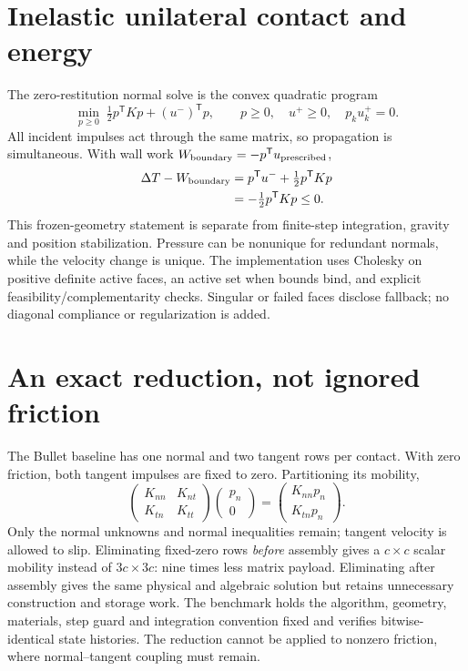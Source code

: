 \documentclass[11pt]{article}
\begin{document}
\section{Inelastic unilateral contact and energy}
The zero-restitution normal solve is the convex quadratic program
\begin{equation}
 \min_{p\geq0}\;\tfrac12p^{\mathsf T}Kp+(u^-)^{\mathsf T}p,
 \qquad p\geq0,\quad u^+\geq0,\quad p_k u_k^+=0.
\end{equation}
All incident impulses act through the same matrix, so propagation is simultaneous.
With wall work $W_{\rm boundary}=-p^{\mathsf T}u_{\rm prescribed}$,
\begin{align}
 \Delta T-W_{\rm boundary}
 &=p^{\mathsf T}u^-+\tfrac12p^{\mathsf T}Kp\\
 &=-\tfrac12p^{\mathsf T}Kp\leq0.
\end{align}
This frozen-geometry statement is separate from finite-step integration,
gravity and position stabilization. Pressure can be nonunique for redundant
normals, while the velocity change is unique. The implementation uses Cholesky
on positive definite active faces, an active set when bounds bind, and explicit
feasibility/complementarity checks. Singular or failed faces disclose fallback;
no diagonal compliance or regularization is added.

\section{An exact reduction, not ignored friction}
The Bullet baseline has one normal and two tangent rows per contact. With zero
friction, both tangent impulses are fixed to zero. Partitioning its mobility,
\begin{equation}
 \begin{pmatrix}K_{nn}&K_{nt}\\K_{tn}&K_{tt}\end{pmatrix}
 \begin{pmatrix}p_n\\0\end{pmatrix}
 =\begin{pmatrix}K_{nn}p_n\\K_{tn}p_n\end{pmatrix}.
\end{equation}
Only the normal unknowns and normal inequalities remain; tangent velocity is
allowed to slip. Eliminating fixed-zero rows \emph{before} assembly gives a
$c\times c$ scalar mobility instead of $3c\times3c$: nine times less matrix
payload. Eliminating after assembly gives the same physical and algebraic
solution but retains unnecessary construction and storage work. The benchmark
holds the algorithm, geometry, materials, step guard and integration convention
fixed and verifies bitwise-identical state histories. The reduction cannot be
applied to nonzero friction, where normal--tangent coupling must remain.
\end{document}
